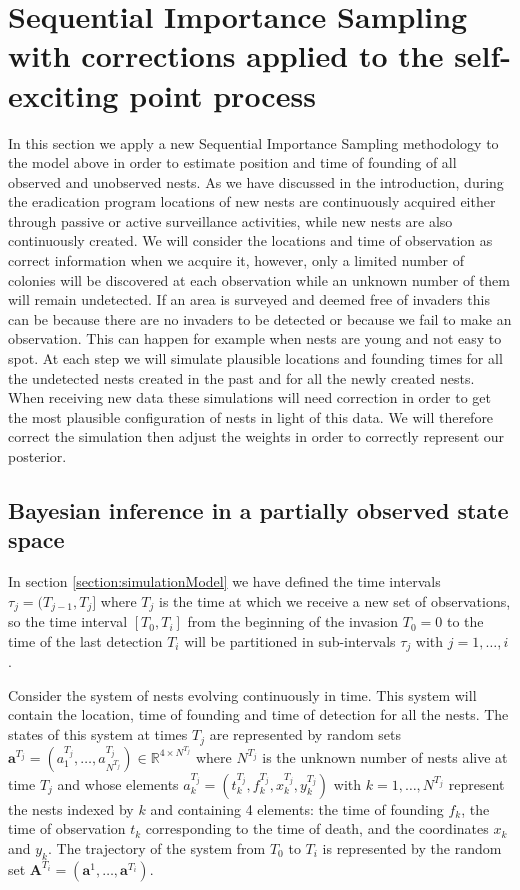 \documentclass[11pt,a4paper]{article}
\renewcommand{\vec}[1]{\mathbf{#1}}
\begin{document}
\section{Sequential Importance Sampling with corrections applied to the self-exciting point process} \label{sec:SISMethod}

In this section we apply a new Sequential Importance Sampling methodology to the model above in order to estimate position and time of founding of all observed and unobserved nests. As we have discussed in the introduction, during the eradication program locations of new nests are continuously acquired either through passive or active surveillance activities, while new nests are also continuously created. We will consider the locations and time of observation as correct information when we acquire it, however, only a limited number of colonies will be discovered at each observation while an unknown number of them will remain undetected. If an area is surveyed and deemed free of invaders this can be because there are no invaders to be detected or because we fail to make an observation. This can happen for example when nests are young and not easy to spot. At each step we will simulate plausible locations and founding times for all the undetected nests created in the past and for all the newly created nests. When receiving new data these simulations will need correction in order to get the most plausible configuration of nests in light of this data. We will therefore correct the simulation then adjust the weights in order to correctly represent our posterior.

\subsection{Bayesian inference in a partially observed state space} \label{subsec:POS}

In section \ref{section:simulationModel} we have defined the time intervals $\tau_j = (T_{j-1}, T_j]$ where $T_j$ is the time at which we receive a new set of observations, so the time interval $[T_0, T_i]$ from the beginning of the invasion $T_0=0$ to the time of the last detection $T_i$ will be partitioned in sub-intervals $\tau_j$ with $j = 1, \dots, i$.

Consider the system of nests evolving continuously in time. This system will contain the location, time of founding and time of detection for all the nests. The states of this system at times $T_j$ are represented by random sets $\vec{a}^{T_j} = (a^{T_j}_1, \dots, a^{T_j}_{N^{T_j}}) \in \mathbb{R}^{4\times N^{T_j}}$ where $N^{T_j}$ is the unknown number of nests alive at time $T_j$ and whose elements $a^{T_j}_k = (t_k^{T_j}, f_k^{T_j}, x_k^{T_j}, y_k^{T_j})$ with $k = 1, \dots , N^{T_j}$ represent the nests indexed by $k$ and containing 4 elements: the time of founding $f_k$, the time of observation $t_k$ corresponding to the time of death, and the coordinates $x_k$ and $y_k$.
The trajectory of the system from $T_0$ to $T_i$ is represented by the random set $\vec{A}^{T_i} = (\vec{a}^1, \dots, \vec{a}^{T_i})$. 
\end{document}

